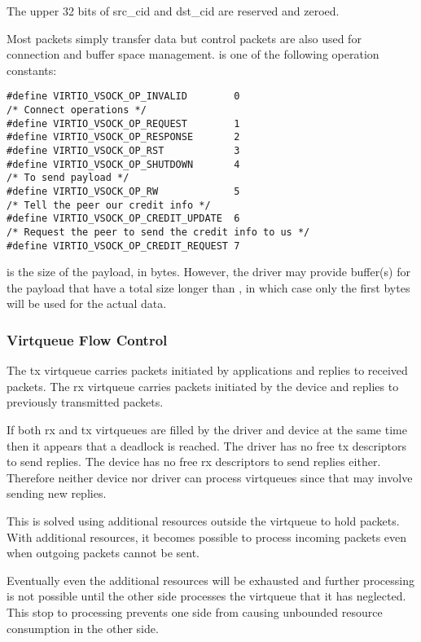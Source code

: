 The upper 32 bits of src_cid and dst_cid are reserved and zeroed.

Most packets simply transfer data but control packets are also used for
connection and buffer space management.   is one of the following
operation constants:

\begin{lstlisting}
#define VIRTIO_VSOCK_OP_INVALID        0
/* Connect operations */
#define VIRTIO_VSOCK_OP_REQUEST        1
#define VIRTIO_VSOCK_OP_RESPONSE       2
#define VIRTIO_VSOCK_OP_RST            3
#define VIRTIO_VSOCK_OP_SHUTDOWN       4
/* To send payload */
#define VIRTIO_VSOCK_OP_RW             5
/* Tell the peer our credit info */
#define VIRTIO_VSOCK_OP_CREDIT_UPDATE  6
/* Request the peer to send the credit info to us */
#define VIRTIO_VSOCK_OP_CREDIT_REQUEST 7
\end{lstlisting}

 is the size of the payload, in bytes. However, the driver may
provide buffer(s) for the payload that have a total size longer than
, in which case only the first  bytes will be used for
the actual data.

\subsubsection{Virtqueue Flow Control}\label{sec:Device Types / Socket Device / Device Operation / Virtqueue Flow Control}

The tx virtqueue carries packets initiated by applications and replies to
received packets.  The rx virtqueue carries packets initiated by the device and
replies to previously transmitted packets.

If both rx and tx virtqueues are filled by the driver and device at the same
time then it appears that a deadlock is reached.  The driver has no free tx
descriptors to send replies.  The device has no free rx descriptors to send
replies either.  Therefore neither device nor driver can process virtqueues
since that may involve sending new replies.

This is solved using additional resources outside the virtqueue to hold
packets.  With additional resources, it becomes possible to process incoming
packets even when outgoing packets cannot be sent.

Eventually even the additional resources will be exhausted and further
processing is not possible until the other side processes the virtqueue that
it has neglected.  This stop to processing prevents one side from causing
unbounded resource consumption in the other side.

